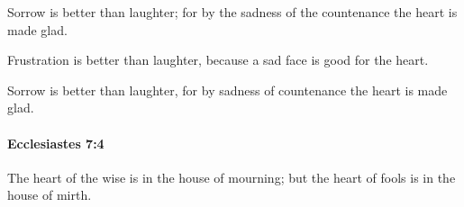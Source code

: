 			\begin{versebox}
					\item[BHS] 
					\item[LXX] 
					\item[ASV] Sorrow is better than laughter; for by the sadness of the countenance the heart is made glad.
					\item[NIV] Frustration is better than laughter, because a sad face is good for the heart.
					\item[NRSV] Sorrow is better than laughter, for by sadness of countenance the heart is made glad.
			\end{versebox}

		\paragraph{Ecclesiastes 7:4} %
			\label{ECCLESIASTES-7-4}

			The heart of the wise is in the house of mourning; but the heart of fools is in the house of mirth.

